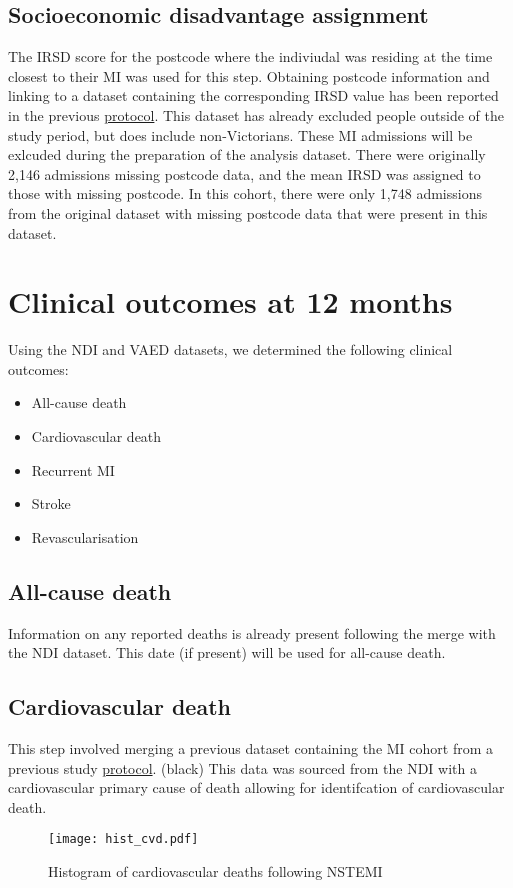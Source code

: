 \documentclass[11pt]{article}
\begin{document}
\subsection{Socioeconomic disadvantage assignment}
The IRSD score for the postcode where the indiviudal was residing at the time closest to their MI was used for this step. Obtaining postcode information and linking to a dataset containing the corresponding IRSD value has been reported in the previous \color{blue} \href{https://github.com/cardiopharmnerd/medsremote}{protocol}. \color{black} This dataset has already excluded people outside of the study period, but does include non-Victorians. These MI admissions will be exlcuded during the preparation of the analysis dataset. There were originally 2,146 admissions missing postcode data, and the mean IRSD was assigned to those with missing postcode. In this cohort, there were only 1,748 admissions from the original dataset with missing postcode data that were present in this dataset. 
\color{violet}
\begin{stlog}\end{stlog}
\color{black}
\pagebreak
\section{Clinical outcomes at 12 months}
Using the NDI and VAED datasets, we determined the following clinical outcomes:
\begin{itemize}
\item All-cause death 
\item Cardiovascular death
\item Recurrent MI
\item Stroke
\item Revascularisation
\end{itemize}
\subsection{All-cause death}
Information on any reported deaths is already present following the merge with the NDI dataset. This date (if present) will be used for all-cause death.
\subsection{Cardiovascular death}
This step involved merging a previous dataset containing the MI cohort from a previous study \color{blue} \href{https://github.com/cardiopharmnerd/medsremote}{protocol}. \color(black) This data was sourced from the NDI with a cardiovascular primary cause of death allowing for identifcation of cardiovascular death. 
\color{violet}
\begin{stlog}\end{stlog}
\color{black}
\begin{figure} [h]
	\centering
	\texttt{[image: hist\_cvd.pdf]}
	\caption{Histogram of cardiovascular deaths following NSTEMI}
	\label{hist_cvd}
\end{figure}
\pagebreak
\end{document}
